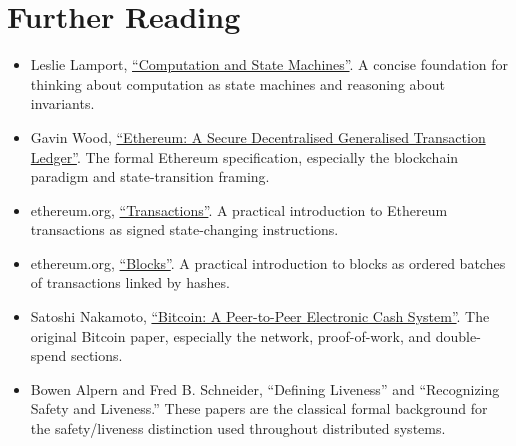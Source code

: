 \section{Further Reading}

\begin{itemize}
\tightlist
\item
  Leslie Lamport,
  \href{https://lamport.azurewebsites.net/pubs/state-machine.pdf}{``Computation
  and State Machines''}. A concise foundation for thinking about
  computation as state machines and reasoning about invariants.
\item
  Gavin Wood,
  \href{https://ethereum.github.io/yellowpaper/paper.pdf}{``Ethereum: A
  Secure Decentralised Generalised Transaction Ledger''}. The formal
  Ethereum specification, especially the blockchain paradigm and
  state-transition framing.
\item
  ethereum.org,
  \href{https://ethereum.org/developers/docs/transactions/}{``Transactions''}.
  A practical introduction to Ethereum transactions as signed
  state-changing instructions.
\item
  ethereum.org,
  \href{https://ethereum.org/developers/docs/blocks/}{``Blocks''}. A
  practical introduction to blocks as ordered batches of transactions
  linked by hashes.
\item
  Satoshi Nakamoto, \href{https://bitcoin.org/bitcoin.pdf}{``Bitcoin: A
  Peer-to-Peer Electronic Cash System''}. The original Bitcoin paper,
  especially the network, proof-of-work, and double-spend sections.
\item
  Bowen Alpern and Fred B. Schneider, ``Defining Liveness'' and
  ``Recognizing Safety and Liveness.'' These papers are the classical
  formal background for the safety/liveness distinction used throughout
  distributed systems.
\end{itemize}

